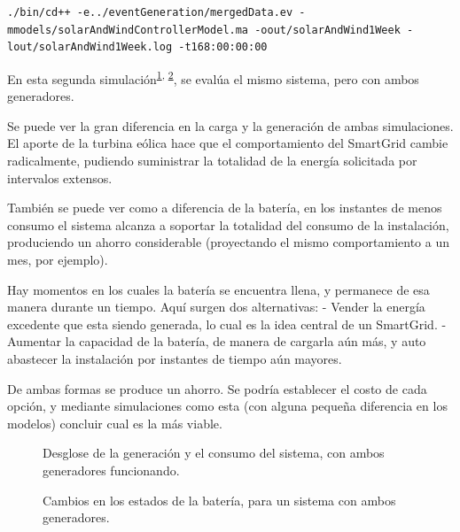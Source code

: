 \texttt{./bin/cd++\ -e../eventGeneration/mergedData.ev\ -mmodels/solarAndWindControllerModel.ma\ -oout/solarAndWind1Week\ -lout/solarAndWind1Week.log\ -t168:00:00:00}

    En esta segunda simulación\textsuperscript{\ref{fig:simu2:1}, \ref{fig:simu2:2}}, se evalúa el mismo sistema, pero con ambos
generadores.

Se puede ver la gran diferencia en la carga y la generación de ambas
simulaciones. El aporte de la turbina eólica hace que el comportamiento
del SmartGrid cambie radicalmente, pudiendo suministrar la totalidad de la
energía solicitada por intervalos extensos.

También se puede ver como a diferencia de la batería, en los instantes
de menos consumo el sistema alcanza a soportar la totalidad del consumo
de la instalación, produciendo un ahorro considerable (proyectando el
mismo comportamiento a un mes, por ejemplo).

Hay momentos en los cuales la batería se encuentra llena, y permanece de
esa manera durante un tiempo. Aquí surgen dos alternativas: - Vender la
energía excedente que esta siendo generada, lo cual es la idea central de
un SmartGrid. - Aumentar la capacidad de la batería, de manera de
cargarla aún más, y auto abastecer la instalación por instantes de tiempo
aún mayores.

De ambas formas se produce un ahorro. Se podría establecer el costo de
cada opción, y mediante simulaciones como esta (con alguna pequeña
diferencia en los modelos) concluir cual es la más viable.

\begin{figure}
    \begin{center}
    \end{center}
    \caption{Desglose de la generación y el consumo del sistema, con ambos generadores funcionando.} \label{fig:simu2:1}
\end{figure}
    
\begin{figure}
    \begin{center}
    \end{center}
    \caption{Cambios en los estados de la batería, para un sistema con ambos generadores.}\label{fig:simu2:2}
\end{figure}
    
